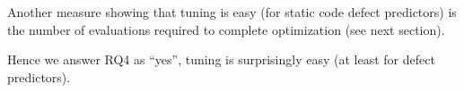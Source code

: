\documentclass{sig-alternative}
\begin{document}
Another measure showing that tuning is easy 
(for static code defect predictors)
is the number of evaluations required to complete optimization
(see next section).

Hence we answer RQ4 as ``yes'', tuning is surprisingly easy (at least
for defect predictors).





  


 
 
\end{document}
